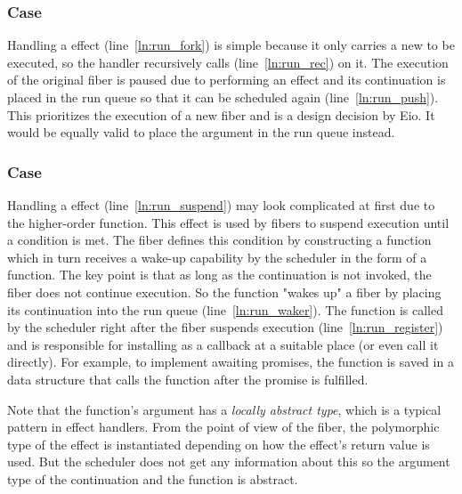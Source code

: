 \subsubsection*{\efork{} Case}
Handling a \efork{} effect (line~\ref{ln:run_fork}) is simple because it only carries a new  to be executed, so the handler recursively calls  (line~\ref{ln:run_rec}) on it.
The execution of the original fiber is paused due to performing an effect and its continuation  is placed in the run queue so that it can be scheduled again (line~\ref{ln:run_push}).
This prioritizes the execution of a new fiber and is a design decision by Eio.
It would be equally valid to place the  argument in the run queue instead.

\subsubsection*{\esuspend{} Case}
Handling a \esuspend{} effect (line~\ref{ln:run_suspend}) may look complicated at first due to the higher-order  function.
This effect is used by fibers to suspend execution until a condition is met.
The fiber defines this condition by constructing a  function which in turn receives a wake-up capability by the scheduler in the form of a  function.
The key point is that as long as the continuation  is not invoked, the fiber does not continue execution.
So the  function "wakes up" a fiber by placing its continuation  into the run queue (line~\ref{ln:run_waker}).
The  function is called by the scheduler right after the fiber suspends execution (line~\ref{ln:run_register}) and is responsible for installing  as a callback at a suitable place (or even call it directly).
For example, to implement awaiting promises, the  function is saved in a data structure that calls the function after the promise is fulfilled.

Note that the  function's argument  has a \emph{locally abstract type}, which is a typical pattern in effect handlers.
From the point of view of the fiber, the polymorphic type  of the \esuspend{} effect is instantiated depending on how the effect's return value is used.
But the scheduler does not get any information about this so the argument type of the continuation  and the  function is abstract.


